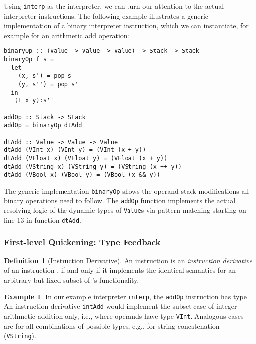 \documentclass[preprint,10pt]{popl14conf}
\begin{document}
Using \texttt{interp} as the interpreter, we can turn our attention to the actual interpreter
instructions.
The following example illustrates a generic implementation of a binary interpreter instruction,
which we can instantiate, for example for an arithmetic add operation:

\begin{lstlisting}[style=prettyhaskell]
binaryOp :: (Value -> Value -> Value) -> Stack -> Stack
binaryOp f s =
  let
    (x, s') = pop s
    (y, s'') = pop s'
  in
   (f x y):s''

addOp :: Stack -> Stack
addOp = binaryOp dtAdd

dtAdd :: Value -> Value -> Value
dtAdd (VInt x) (VInt y) = (VInt (x + y))
dtAdd (VFloat x) (VFloat y) = (VFloat (x + y))
dtAdd (VString x) (VString y) = (VString (x ++ y))
dtAdd (VBool x) (VBool y) = (VBool (x && y))

\end{lstlisting}

The generic implementation \texttt{binaryOp} shows the operand stack modifications all binary
operations need to follow.
The \texttt{addOp} function implements the actual resolving logic of the dynamic types of
\texttt{Value}s via pattern matching starting on line 13 in function \texttt{dtAdd}.

\subsubsection{First-level Quickening: Type Feedback}

\theoremstyle{definition}
\newtheorem{defn}{Definition}
\newtheorem{exmp}{Example}

\begin{defn}[Instruction Derivative]
  An instruction  is an \emph{instruction derivative} of an instruction , if and only if it
  implements the identical semantics for an arbitrary but fixed subset of 's functionality.
\end{defn}


\begin{exmp}
  In our example interpreter \texttt{interp}, the \texttt{addOp} instruction has type
  .
  An instruction derivative \texttt{intAdd} would implement the subset case of integer arithmetic
  addition only, i.e., where operands have type \texttt{VInt}.
  Analogous cases are for all combinations of possible types, e.g., for string concatenation
  (\texttt{VString}).
\end{exmp}
\end{document}
